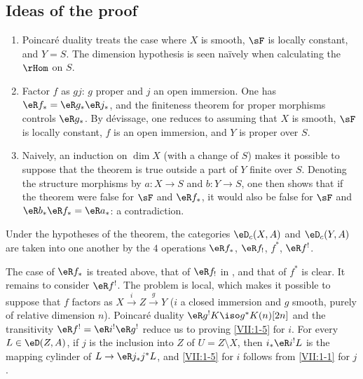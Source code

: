 \documentclass[oneside]{book}
\begin{document}
\subsection{Ideas of the proof}\label{VII:1-4}
\begin{enumerate}[\indent a)]
  \item Poincaré duality treats the case where $X$ is smooth, $\sF$ is
    locally constant, and $Y=S$. The dimension hypothesis is seen na\"ively
    when calculating the $\rHom$ on $S$.
  \item Factor $f$ as $g j$: $g$ proper and $j$ an open immersion. One has
    $\eR f_\ast = \eR g_\ast \eR j_\ast$, and the finiteness theorem for
    proper morphisms controls $\eR g_\ast$. By dévissage, one reduces to
    assuming that $X$ is smooth, $\sF$ is locally constant, $f$ is an open
    immersion, and $Y$ is proper over $S$.
  \item Naively, an induction on $\dim X$ (with a change of $S$) makes it
    possible to suppose that the theorem is true outside a part of $Y$ finite
    over $S$. Denoting the structure morphisms by $a:X\to S$ and $b:Y\to S$,
    one then shows that if the theorem were false for $\sF$ and
    $\eR f_\ast$, it would also be false for $\sF$ and
    $\eR b_\ast \eR f_\ast = \eR a_\ast$: a contradiction.
\end{enumerate}






\begin{corollary_}\label{VII:1-5}
Under the hypotheses of the theorem, the categories $\eD_c(X,A)$ and
$\eD_c(Y,A)$ are taken into one another by the $4$ operations
$\eR f_\ast$, $\eR f_!$, $f^\ast$, $\eR f^!$.
\end{corollary_}

The case of $\eR f_\ast$ is treated above, that of $\eR f_!$ in
\cite[XVII 5.3]{sga4}, and that of $f^\ast$ is clear. It remains to consider
$\eR f^!$. The problem is local, which makes it possible to suppose that $f$
factors as $X\xrightarrow i Z \xrightarrow g Y$ ($i$ a closed immersion and
$g$ smooth, purely of relative dimension $n$). Poincaré duality
$\eR g^! K \iso g^\ast K(n)[2 n]$ and the transitivity
$\eR f^! = \eR i^! \eR g^!$ reduce us to proving \ref{VII:1-5} for $i$.
For every $L\in \eD(Z,A)$, if $j$ is the inclusion into $Z$ of
$U=Z\setminus X$, then $i_\ast \eR i^! L$ is the mapping cylinder of
$L\to \eR j_\ast j^\ast L$, and \ref{VII:1-5} for $i$ follows from
\ref{VII:1-1} for $j$.
\end{document}
